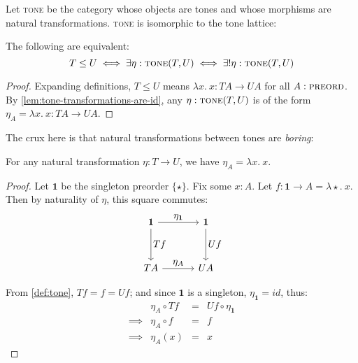\documentclass{rntz}
\newcommand{\mb}[1]{\ensuremath{\mathbf{#1}}}
\newcommand{\mi}[1]{\ensuremath{\mathit{#1}}}
\newcommand{\fn}{\lambda}
\newcommand{\binder}{.~}
\newcommand{\bind}[1]{{#1}\binder}
\newcommand{\fnof}[1]{\fn\bind{#1}}
\newcommand{\cat}[1]{\textsc{#1}} %
\newcommand{\Pre}{\cat{preord}}
\newcommand{\Tone}{\cat{tone}}
\newcommand\idfn{\mi{id}}
\begin{document}

Let \Tone{} be the category whose objects are tones and whose morphisms are
natural transformations. \Tone{} is isomorphic to the tone lattice:

\begin{theorem} \label{thm:tone-poset} The following are equivalent:
  \[T \le U \iff \exists \eta : \Tone(T, U) \iff \exists! \eta : \Tone(T,U)\]
\end{theorem}

\begin{proof}
  Expanding definitions, $T \le U$ means $\fnof{x} x : TA \to
  UA$ for all $A : \Pre$. By \cref{lem:tone-transformations-are-id},
  any $\eta : \Tone(T,U)$ is of the form $\eta_A = \fnof{x} x : TA
  \to UA$.
\end{proof}

The crux here is that natural transformations between tones are \emph{boring}:
\begin{lemma}\label{lem:tone-transformations-are-id}
  For any natural transformation $\eta : T \to U$, we have $\eta_A = \fnof{x}
  x$.
\end{lemma}

\begin{proof}
  Let $\mb{1}$ be the singleton preorder $\{\star\}$. Fix some $x : A$. Let $f :
  \mb{1} \to A = \fnof{\star}{x}$. Then by naturality of $\eta$, this square
  commutes:
  \[\tikzset{
    no line/.style={draw=none,
      commutative diagrams/every label/.append style={/tikz/auto=false}}}
  \begin{tikzcd}[sep=3.3em]
    \mb{1} \arrow[r,"\textstyle \eta_{\mb{1}}"] \arrow[d,"\textstyle Tf"]
    & \mb{1} \arrow[d,"\textstyle Uf"]
    \\ TA \arrow[r,"\textstyle\eta_A"]
    & UA
  \end{tikzcd}\]

From \cref{def:tone}, $Tf = f = Uf$; and since $\mb{1}$ is
a singleton, $\eta_{\mb{1}} = \idfn$, thus:
  \[\begin{array}{rlcl}
  & \eta_A \circ Tf &=& Uf \circ \eta_{\mb{1}}\\
  \implies & \eta_A \circ f &=& f\\
  \implies & \eta_A(x) &=& x
  \end{array}\]
\end{proof}
\end{document}
